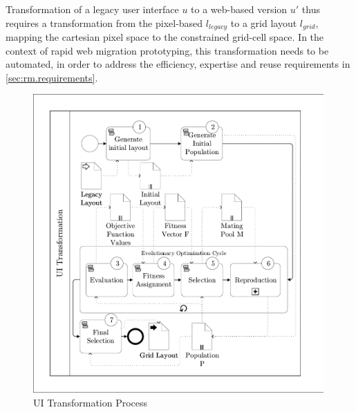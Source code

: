 Transformation of a legacy user interface \(u\) to a web-based version \(u'\) thus requires a transformation from the pixel-based \(l_{legacy}\) to a grid layout \(l_{grid}\), mapping the cartesian pixel space to the constrained grid-cell space.
In the context of rapid web migration prototyping, this transformation needs to be automated, in order to address the efficiency, expertise and reuse requirements in \cref{sec:rm.requirements}.

\begin{figure}
\hypertarget{fig:awsm.rm.uitransformation.process}{%
\centering
\includegraphics[width=0.99\textwidth]{../figures/awsm-rm-UITransformation-BPMN.pdf}
\caption{UI Transformation Process}\label{fig:awsm.rm.uitransformation.process}
}
\end{figure}

